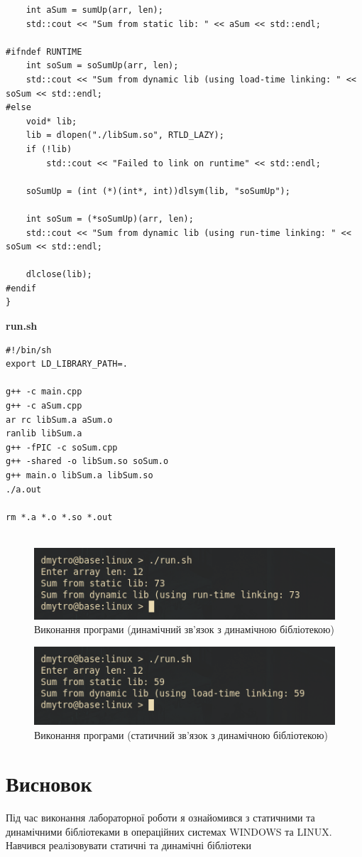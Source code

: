 \documentclass{article}
\begin{document}
\begin{normalsize}
\begin{lstlisting}
	int aSum = sumUp(arr, len);
	std::cout << "Sum from static lib: " << aSum << std::endl;
	
#ifndef RUNTIME
	int soSum = soSumUp(arr, len);
	std::cout << "Sum from dynamic lib (using load-time linking: " << soSum << std::endl;
#else
	void* lib;
	lib = dlopen("./libSum.so", RTLD_LAZY);
	if (!lib)
		std::cout << "Failed to link on runtime" << std::endl;
	
	soSumUp = (int (*)(int*, int))dlsym(lib, "soSumUp");
	
	int soSum = (*soSumUp)(arr, len);
	std::cout << "Sum from dynamic lib (using run-time linking: " << soSum << std::endl;
	
	dlclose(lib);
#endif
}

	\end{lstlisting}
	
	\noindent\textbf{run.sh}
	\begin{lstlisting}
#!/bin/sh
export LD_LIBRARY_PATH=.

g++ -c main.cpp
g++ -c aSum.cpp
ar rc libSum.a aSum.o
ranlib libSum.a
g++ -fPIC -c soSum.cpp
g++ -shared -o libSum.so soSum.o
g++ main.o libSum.a libSum.so
./a.out

rm *.a *.o *.so *.out
		
	\end{lstlisting}
	
		\begin{figure}[H]
		\centering
		\includegraphics[scale=0.9]{4}
		\caption{Виконання програми (динамічний зв'язок з динамічною бібліотекою)}
	\end{figure}

	\begin{figure}[H]
	\centering
	\includegraphics[scale=0.9]{5}
	\caption{Виконання програми (статичний зв'язок з динамічною бібліотекою)}
	\end{figure}
	
	\section*{Висновок}
	Під час виконання лабораторної роботи я ознайомився з статичними та динамічними бібліотеками в операційних
	системах WINDOWS та LINUX. Навчився реалізовувати статичні та динамічні
	бібліотеки
	
	 
\end{normalsize}
\end{document}
